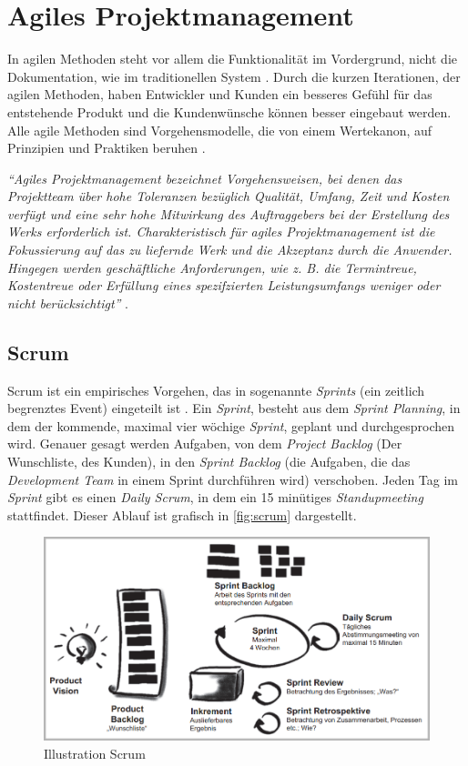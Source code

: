 \section{Agiles Projektmanagement}
\label{chapter:agil-pm}
In agilen Methoden steht vor allem die Funktionalität im Vordergrund, nicht die Dokumentation, wie im traditionellen System \cite{pm-agil-ursula}. Durch die kurzen Iterationen, der agilen Methoden, haben Entwickler und Kunden ein besseres Gefühl für das entstehende Produkt und die Kundenwünsche können besser eingebaut werden. Alle agile Methoden sind Vorgehensmodelle, die von einem Wertekanon, auf Prinzipien und Praktiken beruhen \cite{pm-agil-ursula}. 
\begin{center}
	\textit{\enquote{Agiles Projektmanagement bezeichnet Vorgehensweisen, 
			bei denen das Projektteam über hohe Toleranzen bezüglich Qualität, Umfang, Zeit und Kosten verfügt und eine sehr hohe Mitwirkung des Auftraggebers bei der Erstellung des Werks erforderlich ist. Charakteristisch für agiles Projektmanagement ist die Fokussierung auf das zu liefernde Werk und die Akzeptanz durch die Anwender. Hingegen werden geschäftliche Anforderungen, wie z. B. die Termintreue, Kostentreue oder Erfüllung eines spezifzierten Leistungsumfangs weniger oder nicht berücksichtigt}}  \cite{pm-agil-magazin}.
\end{center}
\subsection{Scrum}
Scrum ist ein empirisches Vorgehen, das in sogenannte \textit{Sprints} (ein zeitlich begrenztes Event) eingeteilt ist \cite{pm-agil-ursula}. Ein \textit{Sprint}, besteht aus dem \textit{Sprint Planning}, in dem der kommende, maximal vier wöchige \textit{Sprint}, geplant und durchgesprochen wird. Genauer gesagt werden Aufgaben, von dem \textit{Project Backlog} (Der Wunschliste, des Kunden), in den \textit{Sprint Backlog} (die Aufgaben, die das \textit{Development Team} in einem Sprint durchführen wird) verschoben. Jeden Tag im \textit{Sprint} gibt es einen \textit{Daily Scrum}, in dem ein 15 minütiges \textit{Standupmeeting} stattfindet. Dieser Ablauf ist grafisch in \autoref{fig:scrum} dargestellt.
\begin{figure}[H]
	\centering
	\includegraphics[width=0.6\linewidth]{images/projektmanagement/scrum2}
	\caption[Scrum]{Illustration Scrum \cite{pm-agil-ursula}}
	\label{fig:scrum}
\end{figure}
